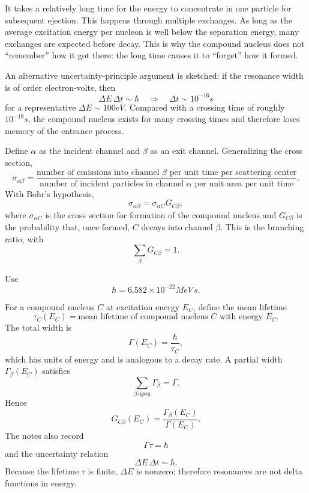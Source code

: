 It takes a relatively long time for the energy to concentrate in one particle for subsequent ejection.  This happens through multiple exchanges.  As long as the average excitation energy per nucleon is well below the separation energy, many exchanges are expected before decay.  This is why the compound nucleus does not ``remember'' how it got there: the long time causes it to ``forget'' how it formed.

An alternative uncertainty-principle argument is sketched: if the resonance width is of order electron-volts, then
\[
  \Delta E\,\Delta t\sim\hbar
  \quad\Longrightarrow\quad
  \Delta t\sim 10^{-16}\unit{s}
\]
for a representative $\Delta E\sim 100\unit{eV}$.  Compared with a crossing time of roughly $10^{-19}\unit{s}$, the compound nucleus exists for many crossing times and therefore loses memory of the entrance process.

Define $\alpha$ as the incident channel and $\beta$ as an exit channel.  Generalizing the cross section,
\[
  \sigma_{\alpha\beta}
  =\frac{\text{number of emissions into channel $\beta$ per unit time per scattering center}}
  {\text{number of incident particles in channel $\alpha$ per unit area per unit time}}.
\]
With Bohr's hypothesis,
\[
  \sigma_{\alpha\beta}=\sigma_{\alpha C}G_{C\beta},
\]
where $\sigma_{\alpha C}$ is the cross section for formation of the compound nucleus and $G_{C\beta}$ is the probability that, once formed, $C$ decays into channel $\beta$.  This is the branching ratio, with
\[
  \sum_{\beta}G_{C\beta}=1.
\]

Use
\[
  \hbar=6.582\times 10^{-22}\unit{MeV\,s}.
\]

For a compound nucleus $C$ at excitation energy $E_C$, define the mean lifetime
\[
  \tau_C(E_C)=\text{mean lifetime of compound nucleus $C$ with energy $E_C$}.
\]
The total width is
\[
  \Gamma(E_C)=\frac{\hbar}{\tau_C},
\]
which has units of energy and is analogous to a decay rate.  A partial width $\Gamma_\beta(E_C)$ satisfies
\[
  \sum_{\beta\ \text{open}}\Gamma_\beta=\Gamma.
\]
Hence
\[
  G_{C\beta}(E_C)=\frac{\Gamma_\beta(E_C)}{\Gamma(E_C)}.
\]
The notes also record
\[
  \Gamma\tau=\hbar
\]
and the uncertainty relation
\[
  \Delta E\,\Delta t\sim\hbar.
\]
Because the lifetime $\tau$ is finite, $\Delta E$ is nonzero; therefore resonances are not delta functions in energy.
